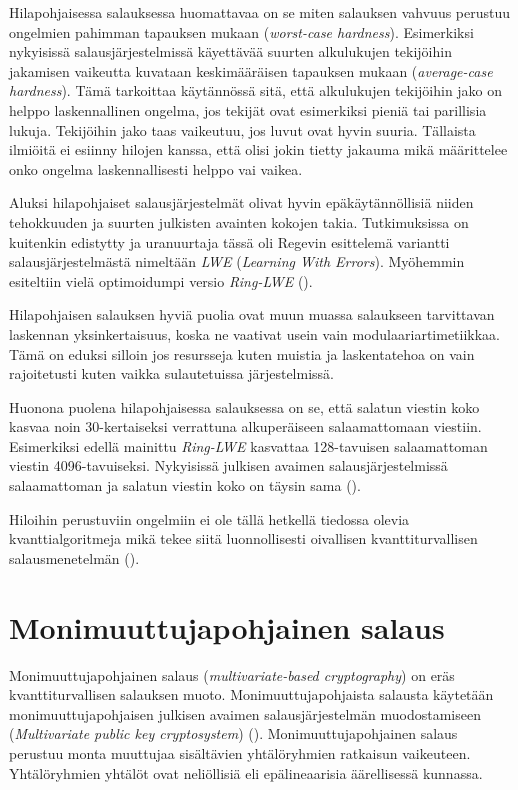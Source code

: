 Hilapohjaisessa salauksessa huomattavaa on se miten salauksen vahvuus perustuu ongelmien pahimman tapauksen mukaan (\emph{worst-case hardness}). Esimerkiksi nykyisissä salausjärjestelmissä käyettävää suurten alkulukujen tekijöihin jakamisen vaikeutta kuvataan keskimääräisen tapauksen mukaan (\emph{average-case hardness}). Tämä tarkoittaa käytännössä sitä, että alkulukujen tekijöihin jako on helppo laskennallinen ongelma, jos tekijät ovat esimerkiksi pieniä tai parillisia lukuja. Tekijöihin jako taas vaikeutuu, jos luvut ovat hyvin suuria. Tällaista ilmiöitä ei esiinny hilojen kanssa, että olisi jokin tietty jakauma mikä määrittelee onko ongelma laskennallisesti helppo vai vaikea.

Aluksi hilapohjaiset salausjärjestelmät olivat hyvin epäkäytännöllisiä niiden tehokkuuden ja suurten julkisten avainten kokojen takia. Tutkimuksissa on kuitenkin edistytty ja uranuurtaja tässä oli Regevin esittelemä variantti salausjärjestelmästä nimeltään \emph{LWE} (\emph{Learning With Errors}). Myöhemmin esiteltiin vielä optimoidumpi versio \emph{Ring-LWE} (\cite{8275352}).

Hilapohjaisen salauksen hyviä puolia ovat muun muassa salaukseen tarvittavan laskennan yksinkertaisuus, koska ne vaativat usein vain modulaariartimetiikkaa. Tämä on eduksi silloin jos resursseja kuten muistia ja laskentatehoa on vain rajoitetusti kuten vaikka sulautetuissa järjestelmissä.

Huonona puolena hilapohjaisessa salauksessa on se, että salatun viestin koko kasvaa noin 30-kertaiseksi verrattuna alkuperäiseen salaamattomaan viestiin. Esimerkiksi edellä mainittu \emph{Ring-LWE} kasvattaa 128-tavuisen salaamattoman viestin 4096-tavuiseksi. Nykyisissä julkisen avaimen salausjärjestelmissä salaamattoman ja salatun viestin koko on täysin sama (\cite{8275352}).

Hiloihin perustuviin ongelmiin ei ole tällä hetkellä tiedossa olevia kvanttialgoritmeja mikä tekee siitä luonnollisesti oivallisen kvanttiturvallisen salausmenetelmän (\cite{regev2006lattice}).

\section{Monimuuttujapohjainen salaus}
Monimuuttujapohjainen salaus (\emph{multivariate-based cryptography}) on eräs kvanttiturvallisen salauksen muoto. Monimuuttujapohjaista salausta käytetään monimuuttujapohjaisen julkisen avaimen salausjärjestelmän muodostamiseen (\emph{Multivariate public key cryptosystem}) (\cite{Ding2009}). Monimuuttujapohjainen salaus perustuu monta muuttujaa sisältävien yhtälöryhmien ratkaisun vaikeuteen. Yhtälöryhmien yhtälöt ovat neliöllisiä eli epälineaarisia äärellisessä kunnassa.

